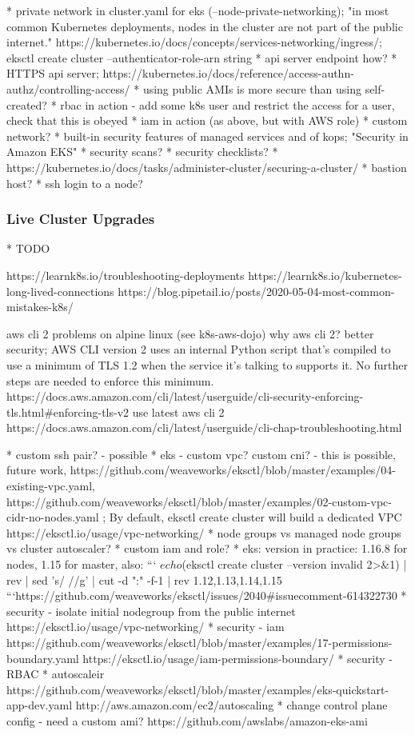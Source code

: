 * private network in cluster.yaml for eks (--node-private-networking); "in most common Kubernetes deployments, nodes in the cluster are not part of the public internet." https://kubernetes.io/docs/concepts/services-networking/ingress/; eksctl create cluster --authenticator-role-arn string
* api server endpoint how?
* HTTPS api server; https://kubernetes.io/docs/reference/access-authn-authz/controlling-access/
* using public AMIs is more secure than using self-created?
* rbac in action - add some k8s user and restrict the access for a user, check that this is obeyed
* iam in action (as above, but with AWS role)
* custom network?
* built-in security features of managed services and of kops; "Security in Amazon EKS"
* security scans?
* security checklists?
* https://kubernetes.io/docs/tasks/administer-cluster/securing-a-cluster/
* bastion host?
* ssh login to a node?

\subsubsection{Live Cluster Upgrades}

* TODO

https://learnk8s.io/troubleshooting-deployments
https://learnk8s.io/kubernetes-long-lived-connections
https://blog.pipetail.io/posts/2020-05-04-most-common-mistakes-k8s/

aws cli 2 problems on alpine linux (see k8s-aws-dojo)
why aws cli 2? better security; AWS CLI version 2 uses an internal Python script that's compiled to use a minimum of TLS 1.2 when the service it's talking to supports it. No further steps are needed to enforce this minimum. https://docs.aws.amazon.com/cli/latest/userguide/cli-security-enforcing-tls.html#enforcing-tls-v2
 use latest aws cli 2 https://docs.aws.amazon.com/cli/latest/userguide/cli-chap-troubleshooting.html

* custom ssh pair? - possible
* eks - custom vpc? custom cni? - this is possible, future work, https://github.com/weaveworks/eksctl/blob/master/examples/04-existing-vpc.yaml, https://github.com/weaveworks/eksctl/blob/master/examples/02-custom-vpc-cidr-no-nodes.yaml ; By default, eksctl create cluster will build a dedicated VPC https://eksctl.io/usage/vpc-networking/
* node groups vs managed node groups vs cluster autoscaler?
* custom iam and role?
* eks: version in practice: 1.16.8 for nodes, 1.15 for master, also:
```
$ echo $(eksctl create cluster --version invalid 2>&1) | rev | sed 's/ //g' | cut -d ":" -f-1 | rev
1.12,1.13,1.14,1.15
```https://github.com/weaveworks/eksctl/issues/2040#issuecomment-614322730
* security - isolate initial nodegroup from the public internet https://eksctl.io/usage/vpc-networking/
* security - iam https://github.com/weaveworks/eksctl/blob/master/examples/17-permissions-boundary.yaml https://eksctl.io/usage/iam-permissions-boundary/
* security - RBAC
* autoscaleir https://github.com/weaveworks/eksctl/blob/master/examples/eks-quickstart-app-dev.yaml http://aws.amazon.com/ec2/autoscaling
* change control plane config - need a custom ami? https://github.com/awslabs/amazon-eks-ami


